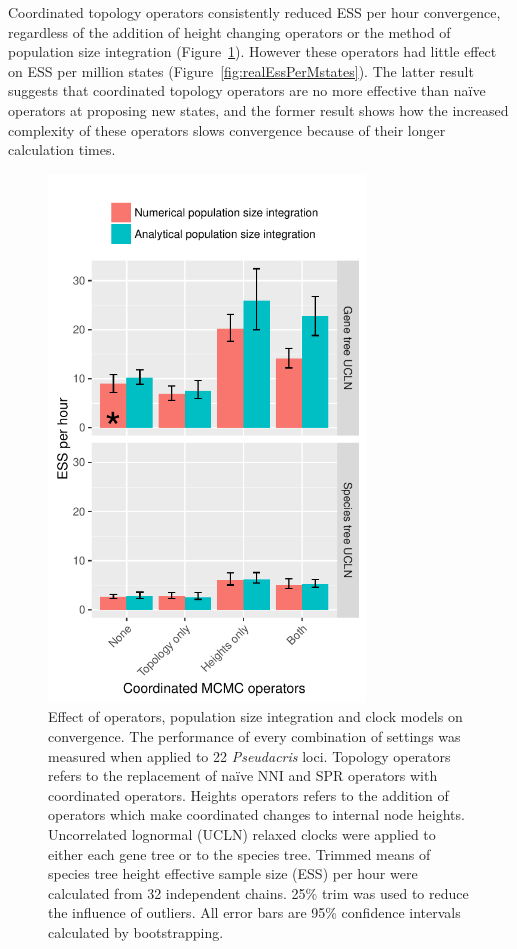 \documentclass[12pt]{article}
\begin{document}
Coordinated topology operators consistently reduced ESS per hour convergence,
regardless of the addition of height changing operators or the method of
population size integration (Figure~\ref{fig:realEssPerHour}). However these
operators had little effect on ESS per million states (Figure~\ref{fig:realEssPerMstates}).
The latter result suggests that coordinated topology operators are no more
effective than na\"ive operators at proposing new states, and the former result
shows how the increased complexity of these operators slows convergence because
of their longer calculation times.

\begin{figure}[htb!]
\centering
\includegraphics[height=14cm]{speciesTreeHeight_ess_per_hour.pdf}
\caption
{Effect of operators, population size integration and clock models on
convergence. The performance of every combination of settings was measured when
applied to 22 \textit{Pseudacris} loci. Topology operators refers to the
replacement of na\"ive NNI and SPR operators with coordinated operators. Heights
operators refers to the addition of operators which make coordinated changes to
internal node heights. Uncorrelated lognormal (UCLN) relaxed clocks were applied
to either each gene tree or to the species tree. Trimmed means of species tree
height effective sample size (ESS) per hour were calculated from 32 independent
chains. 25\% trim was used to reduce the influence of outliers. All error bars
are 95\% confidence intervals calculated by bootstrapping.}
\label{fig:realEssPerHour}
\end{figure}
\end{document}
